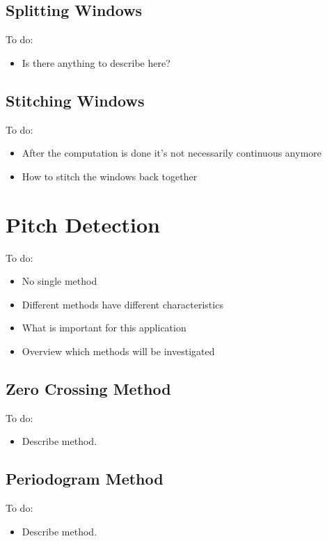 \subsection{Splitting Windows}

\color{red}
To do:
\begin{itemize}
	\item Is there anything to describe here?
\end{itemize}
\color{black}

\subsection{Stitching Windows}

\color{red}
To do:
\begin{itemize}
	\item After the computation is done it's not necessarily  continuous anymore
	\item How to stitch the windows back together
\end{itemize}
\color{black}

\section{Pitch Detection}

\color{red}
To do:
\begin{itemize}
	\item No single method
	\item Different methods have different characteristics
	\item What is important for this application
	\item Overview which methods will be investigated
\end{itemize}
\color{black}

\subsection{Zero Crossing Method}

\color{red}
To do:
\begin{itemize}
	\item Describe method.
\end{itemize}
\color{black}

\subsection{Periodogram Method}

\color{red}
To do:
\begin{itemize}
	\item Describe method.
\end{itemize}
\color{black}

